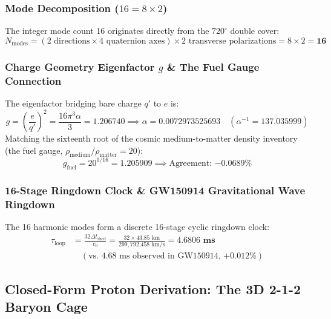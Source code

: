 \documentclass[11pt,a4paper]{article}
\begin{document}
\subsubsection{Mode Decomposition ($16 = 8 \times 2$)}
\label{subsubsec:mode_decomp}

The integer mode count 16 originates directly from the $720^\circ$ double cover:
\begin{equation}
N_{\text{modes}} = (2\text{ directions} \times 4\text{ quaternion axes}) \times 2\text{ transverse polarizations} = 8 \times 2 = \mathbf{16}
\end{equation}

\subsubsection{Charge Geometry Eigenfactor $g$ \& The Fuel Gauge Connection}
\label{subsubsec:eigenfactor_g}

The eigenfactor bridging bare charge $q'$ to $e$ is:
\begin{equation}
g = \left(\frac{e}{q'}\right)^2 = \frac{16\pi^3 \alpha}{3} = \mathbf{1.206740} \implies \alpha = 0.0072973525693 \quad (\alpha^{-1} = 137.035999)
\end{equation}
Matching the sixteenth root of the cosmic medium-to-matter density inventory (the fuel gauge, $\rho_{\text{medium}}/\rho_{\text{matter}} = 20$):
\begin{equation}
\boxed{g_{\text{fuel}} = 20^{1/16} = \mathbf{1.205909} \implies \text{Agreement: } \mathbf{-0.0689\%}}
\end{equation}

\subsubsection{16-Stage Ringdown Clock \& GW150914 Gravitational Wave Ringdown}
\label{subsubsec:ringdown_clock}

The 16 harmonic modes form a discrete 16-stage cyclic ringdown clock:
\begin{equation}
\begin{aligned}
\tau_{\text{loop}} &= \frac{32 \Delta t_{\text{shed}}}{c_0} = \frac{32 \times 43.85\text{ km}}{299,792.458\text{ km/s}} = \mathbf{4.6806\text{ ms}} \\
&\quad (\text{vs. } 4.68\text{ ms observed in GW150914, } \mathbf{+0.012\%})
\end{aligned}
\end{equation}

\subsection{Closed-Form Proton Derivation: The 3D 2-1-2 Baryon Cage}
\label{subsec:proton_cage}
\end{document}
